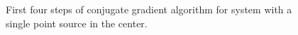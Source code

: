 \documentclass[paper=a4, fontsize=11pt]{scrartcl} %
\numberwithin{equation}{section} %
\numberwithin{figure}{section} %
\numberwithin{table}{section} %
\begin{document}
\begin{figure}
\centering
{}
\hfill
{}
\caption{First four steps of conjugate gradient algorithm for system with a single point source in the center.}
\label{fig:cgsteps}
\end{figure}
\end{document}
